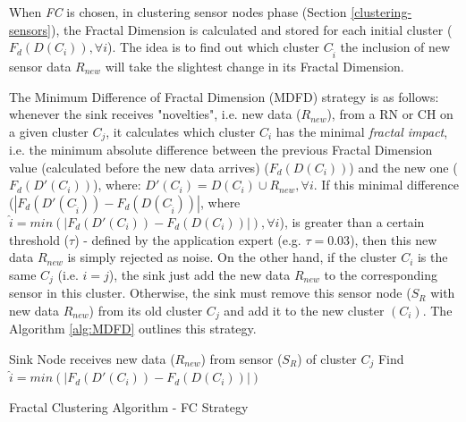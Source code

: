 \documentclass[conference]{IEEEtran}
\begin{document}
When \textit{FC} is chosen, in clustering sensor nodes phase (Section
\ref{clustering-sensors}), the Fractal Dimension is calculated and stored for
each initial cluster ($F_{d}(D(C_i)), \forall i$). The idea is to find out which
cluster $C_{\hat{i}}$ the inclusion of new sensor data $R_{new}$ will take the
slightest change in its Fractal Dimension.

The Minimum Difference of Fractal Dimension (MDFD) strategy is as follows:
whenever the sink receives "novelties", i.e. new data ($R_{new}$), from a RN or CH on
a given cluster $C_j$, it calculates which cluster $C_i$ has the minimal
\textit{fractal impact}, i.e. the minimum absolute difference between the
previous Fractal Dimension value (calculated before the new data arrives)
($F_d(D(C_i))$) and the new one ($F_d(D'(C_i))$), where: $D'(C_i) = D(C_i) \cup
R_{new}, \forall i$.
If this minimal difference ($|F_d(D'(C_{\hat{i}})) - F_d(D(C_{\hat{i}}))|$,
where $\hat{i} = min(|F_d(D'(C_i)) - F_d(D(C_i))|), \forall i$), is greater than
a certain threshold ($\tau$) - defined by the application expert (e.g. $\tau =
0.03$), then this new data $R_{new}$ is simply rejected as noise.
On the other hand, if the cluster $C_i$ is the same $C_j$ (i.e. $i=j$), the
sink just add the new data $R_{new}$ to the corresponding sensor in this cluster.
Otherwise, the sink must remove this sensor node ($S_{R}$ with new data
$R_{new}$) from its old cluster $C_j$ and add it to the new cluster $(C_i)$.
The Algorithm \ref{alg:MDFD} outlines this strategy.

\begin{algorithm}
 \SetAlgoLined
 \LinesNumbered
 Sink Node receives new data ($R_{new}$) from sensor ($S_{R}$) of cluster $C_j$\;
  Find $\hat{i} = min(|F_d(D'(C_i)) - F_d(D(C_i))|)$\;
 
 \caption{Fractal Clustering Algorithm - FC Strategy}
 \label{alg:MDFD}
\end{algorithm}
\end{document}
